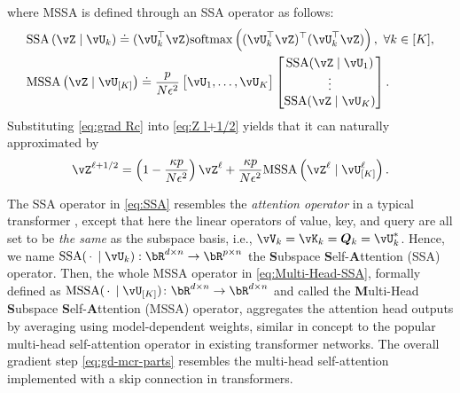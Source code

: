 \documentclass[\toplevelprefix/book-main.tex]{subfiles}
\begin{document}
where MSSA is defined through an SSA operator as follows:
\begin{align}
    & \mathrm{SSA}\left(\vZ \mid \vU_{k}\right) 
    \doteq (\vU_{k}^\top \vZ)\mathrm{softmax}\left((\vU_{k}^\top\vZ)^\top(\vU_{k}^\top\vZ)\right), \ \forall k \in [K], \label{eq:SSA} \\
    & \mathrm{MSSA}\left(\vZ \mid \vU_{[K]}\right) 
    \doteq \frac{p}{N\epsilon^2} \mat{\vU_{1}, \dots, \vU_{K}}\mat{\mathrm{SSA}({\vZ \mid \vU_{1}}) \\ \vdots \\ \mathrm{SSA}({\vZ \mid \vU_{K}})}.\label{eq:Multi-Head-SSA}
\end{align}  
Substituting \eqref{eq:grad Rc} into \eqref{eq:Z l+1/2} yields that it can naturally approximated by
\begin{equation}
    \vZ^{\ell + 1/2} = \left(1 - \frac{\kappa p}{N\epsilon^2}\right) \vZ^{\ell} + \frac{\kappa p}{N\epsilon^2} \mathrm{MSSA}\left({\vZ^{\ell} \mid \vU_{[K]}^{\ell}}\right).  \label{eq:gd-mcr-parts} 
\end{equation}



\begin{remark}
    The SSA operator in \eqref{eq:SSA} resembles the \textit{attention operator} in a typical transformer \citep{vaswani2017attention}, except that here the linear operators of value, key, and query  are all set to be \textit{the same} as the subspace basis, i.e., $\vV_{k} = \vK_{k} = \bm{Q}_{k} = \vU_k^*$. Hence, we name $\mathrm{SSA}({\spcdot\mid\vU_k}): \bR^{d\times n} \rightarrow \bR^{p\times n}$  the \textbf{S}ubspace \textbf{S}elf-\textbf{A}ttention (SSA) operator. Then, the whole MSSA operator in \eqref{eq:Multi-Head-SSA}, formally defined as \(\mathrm{MSSA}({\spcdot \mid \vU_{[K]}}) \colon \bR^{d \times n} \to \bR^{d \times n}\) and called the \textbf{M}ulti-Head \textbf{S}ubspace \textbf{S}elf-\textbf{A}ttention (MSSA) operator, aggregates the attention head outputs by averaging using model-dependent weights, similar in concept to the popular multi-head self-attention operator in existing transformer networks.  The overall gradient step \eqref{eq:gd-mcr-parts} resembles the multi-head self-attention implemented with a skip connection in transformers.  
\end{remark}
\end{document}

